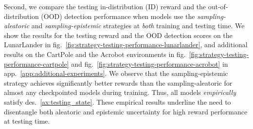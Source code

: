 Second, we compare the testing in-distribution (ID) reward and the out-of-distribution (OOD) detection performance when models use the \emph{sampling-aleatoric} and \emph{sampling-epistemic} strategies at \emph{both} training and testing time. We show the results for the testing reward and the OOD detection scores on the LunarLander in fig.~\ref{fig:strategy-testing-performance-lunarlander}, and additional results on the CartPole and the Acrobot environments in fig.~\ref{fig:strategy-testing-performance-cartpole} and fig.~\ref{fig:strategy-testing-performance-acrobot} in app.~\ref{app:additional-experiments}. We observe that the sampling-epistemic strategy achieves significantly better rewards than the sampling-aleatoric for almost any checkpointed models during training. Thus, all models \emph{empirically} satisfy des.~\ref{ax:testing_state}. These empirical results underline the need to disentangle both aleatoric and epistemic uncertainty for high reward performance at testing time.


%
%


